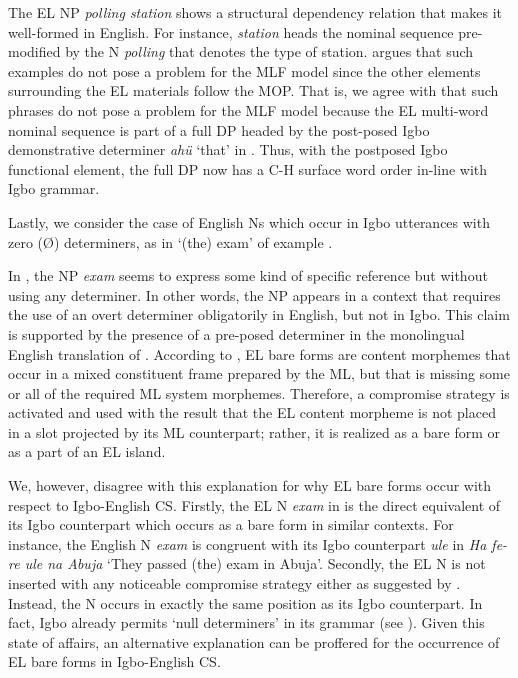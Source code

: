 \documentclass[output=paper]{langsci/langscibook}
\begin{document}
The EL NP \textit{polling station}\textbf{\textit{}} shows a structural dependency relation that makes it well-formed in English. For instance, \textit{station} heads the nominal sequence pre-modified by the N \textit{polling} that denotes the type of station. \citet{MyersScotton2002} argues that such examples do not pose a problem for the MLF model since the other elements surrounding the EL materials follow the MOP. That is, we agree with \citet[139]{MyersScotton2002} that such phrases do not pose a problem for the MLF model because the EL multi-word nominal sequence is part of a full DP headed by the post-posed Igbo demonstrative determiner \textit{ahü} ‘that’ in . Thus, with the postposed Igbo functional element, the full DP now has a C-H surface word order in-line with Igbo grammar. 

Lastly, we consider the case of English Ns which occur in Igbo utterances with zero (Ø) determiners, as in ‘(the) exam’ of example . 

In , the NP \textit{exam} seems to express some kind of specific reference but without using any determiner. In other words, the NP appears in a context that requires the use of an overt determiner obligatorily in English, but not in Igbo. This claim is supported by the presence of a pre-posed determiner in the monolingual English translation of . According to \citet[106]{MyersScottonJake2001}, EL bare forms are content morphemes that occur in a mixed constituent frame prepared by the ML, but that is missing some or all of the required ML system morphemes. Therefore, a compromise strategy is activated and used with the result that the EL content morpheme is not placed in a slot projected by its ML counterpart; rather, it is realized as a bare form or as a part of an EL island. 

We, however, disagree with this explanation for why EL bare forms occur with respect to Igbo-English CS. Firstly, the EL N \textit{exam} in  is the direct equivalent of its Igbo counterpart which occurs as a bare form in similar contexts. For instance, the English N \textit{exam} is congruent with its Igbo counterpart \textit{ule} in \textit{Ha fe-re ule na Abuja} ‘They passed (the) exam in Abuja’. Secondly, the EL N is not inserted with any noticeable compromise strategy either as suggested by \citet[106]{MyersScottonJake2001}. Instead, the N occurs in exactly the same position as its Igbo counterpart. In fact, Igbo already permits ‘null determiners’ in its grammar (see \citealt[64--65]{Obiamalu2013}). Given this state of affairs, an alternative explanation can be proffered for the occurrence of EL bare forms in Igbo-English CS. 
\end{document}
